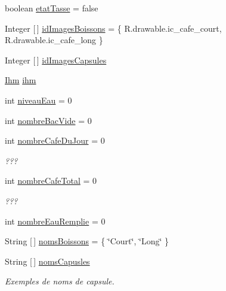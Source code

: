 \begin{DoxyCompactItemize}
\item 
boolean \hyperlink{classcom_1_1example_1_1ekawa_1_1_cafetiere_a93c5021591facf06397e760c11556904}{etat\+Tasse} = false
\item 
Integer \mbox{[}$\,$\mbox{]} \hyperlink{classcom_1_1example_1_1ekawa_1_1_cafetiere_a10645115a166d3529e63aeb4ea16a869}{id\+Images\+Boissons} = \{ R.\+drawable.\+ic\+\_\+cafe\+\_\+court, R.\+drawable.\+ic\+\_\+cafe\+\_\+long \}
\item 
Integer \mbox{[}$\,$\mbox{]} \hyperlink{classcom_1_1example_1_1ekawa_1_1_cafetiere_a7558b3f423bd53d4198a7c143bd2d657}{id\+Images\+Capsules}
\item 
\hyperlink{classcom_1_1example_1_1ekawa_1_1_ihm}{Ihm} \hyperlink{classcom_1_1example_1_1ekawa_1_1_cafetiere_a7db4a63088834eda5f6a3e951611bf82}{ihm}
\item 
int \hyperlink{classcom_1_1example_1_1ekawa_1_1_cafetiere_aaf8e1a960f803c2de4defa414b5984a4}{niveau\+Eau} = 0
\item 
int \hyperlink{classcom_1_1example_1_1ekawa_1_1_cafetiere_a6491d6d04db5d6e7da868565b84f6d7f}{nombre\+Bac\+Vide} = 0
\item 
int \hyperlink{classcom_1_1example_1_1ekawa_1_1_cafetiere_a123b6fcb9a9c1decae40e026660e716b}{nombre\+Cafe\+Du\+Jour} = 0
\begin{DoxyCompactList}\small\item\em ??? \end{DoxyCompactList}\item 
int \hyperlink{classcom_1_1example_1_1ekawa_1_1_cafetiere_ac22f9da8ed59c7362871b8f22e501e23}{nombre\+Cafe\+Total} = 0
\begin{DoxyCompactList}\small\item\em ??? \end{DoxyCompactList}\item 
int \hyperlink{classcom_1_1example_1_1ekawa_1_1_cafetiere_a2332c2e33acff5084b4571663b48bd89}{nombre\+Eau\+Remplie} = 0
\item 
String \mbox{[}$\,$\mbox{]} \hyperlink{classcom_1_1example_1_1ekawa_1_1_cafetiere_a59db420b33a9f03aad97d6cad4f87c03}{noms\+Boissons} = \{ \char`\"{}Court\char`\"{}, \char`\"{}Long\char`\"{} \}
\item 
String \mbox{[}$\,$\mbox{]} \hyperlink{classcom_1_1example_1_1ekawa_1_1_cafetiere_a127a27c8f3b4c6c5dc4bfb639f654b3d}{noms\+Capusles}
\begin{DoxyCompactList}\small\item\em Exemples de noms de capsule. \end{DoxyCompactList}\item 

\end{DoxyCompactItemize}

